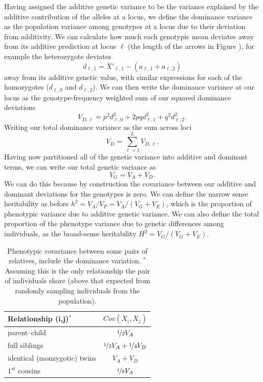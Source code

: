 Having assigned the additive genetic variance to be the variance
explained by the additive contribution of the alleles at a locus, we
define the dominance variance as the population variance among
genotypes at a locus due to their deviation from additivity.
We can calculate how much each genotypic mean deviates away from its
additive prediction at locus $\ell$ (the length of the arrows in
Figure \label{fig:add_dom}), for example the heterozygote deviates 
\begin{equation}
d_{\ell,1} =\overline{X}'_{\ell,1}  - (a_{\ell,1}+ a_{\ell,2})
\end{equation}
away from its additive genetic value, with similar expressions for
each of the homozygotes ($d_{\ell,0}$ and $d_{\ell,2}$). We can then write the dominance variance at
our locus as the genotype-frequency weighted sum of our squared
dominance deviations
\begin{equation}
V_{D,\ell} = p^2 d_{\ell,0}^2+ 2pq d_{\ell,1}^2+ q^2 d_{\ell,2}^2.
\end{equation}
Writing our total dominance variance as the sum across loci 
\begin{equation}
V_D = \sum_{\ell=1}^{L}  V_{D,\ell}. 
\end{equation}
Having now partitioned all of the genetic variance into additive and
dominant terms, we can write our total genetic variance as 
\begin{equation}
V_{G} = V_A+V_D.
\end{equation}
We can do this because by construction the covariance between our
additive and dominant deviations for the genotypes is zero. We can
define the narrow sense heritability as before
$h^2=V_A/V_P=V_A/(V_G+V_E)$, which is the proportion of phenotypic
variance due to additive genetic variance. We can also define the 
total proportion of the phenotype variance due to genetic differences
among individuals, as the broad-sense heritability $H^2 =
V_G/(V_G+V_E)$. \\

\begin{table}
\begin{center}
\begin{tabular}{| l | c|}
\hline
Relationship (i,j)$^{*}$ &  $Cov(X_i,X_j)$  \\
\hline
parent--child & $\nicefrac{1}{2} V_A$\\
full siblings &$\nicefrac{1}{2} V_A +\nicefrac{1}{4} V_D$\\
identical (monzygotic) twins & $V_A+V_D$ \\
$1^{st}$ cousins & $\nicefrac{1}{8} V_A$\\
\hline
\end{tabular}
\end{center}
\caption{Phenotypic covariance between some pairs of relatives,
  include the dominance variation. $^{*}$Assuming this is the only relationship
the pair of individuals share (above that expected from randomly
sampling individuals from the population). } %
\label{table:domcovar}
\end{table}

